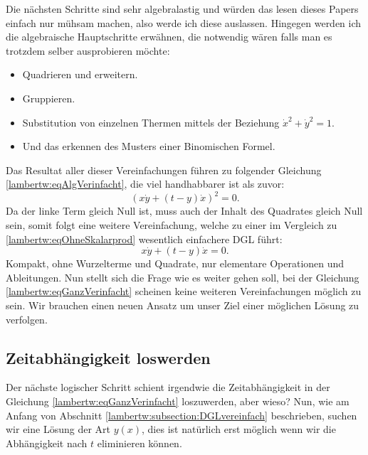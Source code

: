 Die nächsten Schritte sind sehr algebralastig und würden das lesen dieses Papers einfach nur mühsam machen, also werde ich diese auslassen. Hingegen werden ich die algebraische Hauptschritte erwähnen, die notwendig wären falls man es trotzdem selber ausprobieren möchte:
\begin{itemize}
	\item
	Quadrieren und erweitern.
	\item
	Gruppieren.
	\item
	Substitution von einzelnen Thermen mittels der Beziehung \(\dot{x}^2 + \dot{y}^2 = 1\).
	\item
	Und das erkennen des Musters einer Binomischen Formel.
\end{itemize} 
Das Resultat aller dieser Vereinfachungen führen zu folgender Gleichung \eqref{lambertw:eqAlgVerinfacht}, die viel handhabbarer ist als zuvor:
\begin{equation}
	(x \dot{y} + (t-y) \dot{x})^2
	= 0.
	\label{lambertw:eqAlgVerinfacht}
\end{equation}
Da der linke Term gleich Null ist, muss auch der Inhalt des Quadrates gleich Null sein, somit folgt eine weitere Vereinfachung, welche zu einer im Vergleich zu \eqref{lambertw:eqOhneSkalarprod} wesentlich einfachere DGL führt:
\begin{equation}
	x \dot{y} + (t-y) \dot{x}
	= 0.
	\label{lambertw:eqGanzVerinfacht}
\end{equation}
Kompakt, ohne Wurzelterme und Quadrate, nur elementare Operationen und Ableitungen. Nun stellt sich die Frage wie es weiter gehen soll, bei der Gleichung \eqref{lambertw:eqGanzVerinfacht} scheinen keine weiteren Vereinfachungen möglich zu sein. Wir brauchen einen neuen Ansatz um unser Ziel einer möglichen Lösung zu verfolgen.

\subsection{Zeitabhängigkeit loswerden
	\label{lambertw:subsection:ZeitabhLoswerden}}
Der nächste logischer Schritt schient irgendwie die Zeitabhängigkeit in der Gleichung \eqref{lambertw:eqGanzVerinfacht} loszuwerden, aber wieso? Nun, wie am Anfang von Abschnitt \ref{lambertw:subsection:DGLvereinfach} beschrieben, suchen wir eine Lösung der Art \(y(x)\), dies ist natürlich erst möglich wenn wir die Abhängigkeit nach \(t\) eliminieren können.


